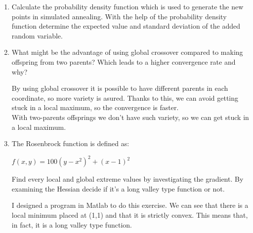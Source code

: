 \documentclass[12pt,english]{article}
\newenvironment{statement}{\fontfamily{ptm}\selectfont}{\par}
\begin{document}
\begin{enumerate}

	\item
		\begin{statement}
		Calculate the probability density function which is used to generate the new points in simulated annealing. With the help of the probability density function determine the expected value and standard deviation of the added random variable.
		\end{statement}


	\item
		\begin{statement}
		What might be the advantage of using global crossover compared to making offspring from two parents? Which leads to a higher convergence rate and why?
		\end{statement}
		By using global crossover it is possible to have different parents in each coordinate, so more variety is asured. Thanks to this, we can avoid getting stuck in a local maximum, so the convergence is faster.\\
		With two-parents offsprings we don't have such variety, so we can get stuck in a local maximum.
	\item
		\begin{statement}
			The Rosenbrock function is defined as:
			\begin{center}
				$f(x,y)=100(y-x^2)^2 + (x-1)^2$
			\end{center}
			Find every local and global extreme values by investigating the gradient. By examining the Hessian decide if it’s a long valley type function or not.
		\end{statement}
		I designed a program in Matlab to do this exercise. We can see that there is a local minimum placed at (1,1) and that it is strictly convex. This means that, in fact, it is a long valley type function.


\end{enumerate}
\end{document}
